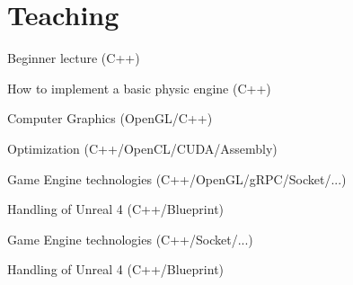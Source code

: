 \documentclass[a4paper]{deedy-resume} %
\begin{document}
\begin{minipage}[t]{0.66\textwidth} %


\section{Teaching}


	\vspace{\topsep} %
	\begin{tightitemize}
		\item Beginner lecture (C++)
		\item How to implement a basic physic engine (C++)
		\item Computer Graphics (OpenGL/C++)
		\item Optimization (C++/OpenCL/CUDA/Assembly)
	\end{tightitemize}

\sectionspace


	\begin{tightitemize}
		\item Game Engine technologies (C++/OpenGL/gRPC/Socket/...)
		\item Handling of Unreal 4 (C++/Blueprint)
	\end{tightitemize}

\sectionspace


	\begin{tightitemize}
		\item Game Engine technologies (C++/Socket/...)
		\item Handling of Unreal 4 (C++/Blueprint)
	\end{tightitemize}

\sectionspace


\end{minipage}
\end{document}
